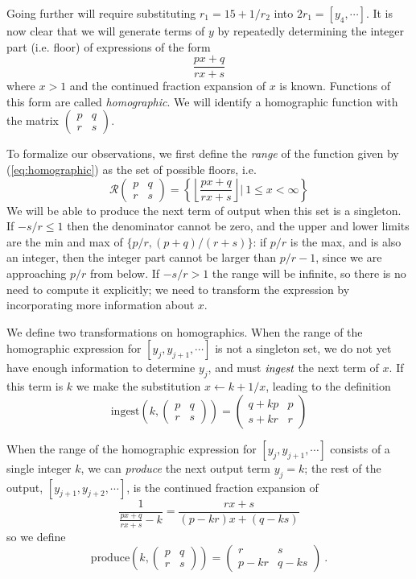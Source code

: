 \documentclass[11pt, oneside]{amsart}   	%
\newcommand{\pqrs}{\left(
\begin{smallmatrix} 
p & q\\ 
r & s 
\end{smallmatrix}
\right)}
\newcommand{\homographic}[4]{\begin{pmatrix} #1 & #2\\ #3 & #4 \end{pmatrix}}
\renewcommand{\:}{\negthickspace:\negthickspace}
\begin{document}
Going further will require substituting $r_1 = 15+1/r_2$ into $2r_1 = [y_4,\cdots]$.
It is now clear that we will generate terms of $y$ by repeatedly determining the integer part (i.e. floor) of expressions of the form
\begin{equation}\label{eq:homographic}
\frac{px+q}{rx+s}
\end{equation}
where $x>1$ and the continued fraction expansion of $x$ is known. Functions of this form are called \emph{homographic}.
We will identify a homographic function with the matrix
$\left(
\begin{smallmatrix} 
p & q\\ 
r & s 
\end{smallmatrix}
\right)$.

To formalize our observations, we first define the \emph{range} of the function given by (\ref{eq:homographic})
as the set of possible floors, i.e.
\[
\mathcal{R}\pqrs = \left\{ \left\lfloor \frac{px+q}{rx+s} \right\rfloor | \  1 \leq x < \infty \right\}
\]
We will be able to produce the next term of output when this set is a singleton. If $-s/r \leq 1$ then the denominator cannot be zero,
and the upper and lower limits are the min and max of $\{p/r, (p+q)/(r+s)\}$: if $p/r$ is the max, and is also an integer, then the
integer part cannot be larger than $p/r-1$, since we are approaching $p/r$ from below. If  $-s/r > 1$ the range will be infinite, so
there is no need to compute it explicitly; we need to transform the expression by incorporating more information about $x$.

We define two transformations on homographics. When the range of the homographic expression for $[y_j,y_{j+1},\cdots]$ is not a
singleton set, we do not yet have enough information to determine $y_j$, and must $\emph{ingest}$ the next term of $x$. If this term
is $k$ we make the substitution $x \leftarrow k + 1/x$, leading to the definition
\[
\mbox{ingest}(k,\pqrs) = \homographic{q+kp}{p}{s+kr}{r}%
\]

When the range of the homographic expression for $[y_j,y_{j+1},\cdots]$ consists of a single integer $k$, we can \emph{produce}
the next output term $y_j = k$; the rest of the output, $[y_{j+1},y_{j+2},\cdots]$, is the continued fraction expansion of
\[
\frac{1}{\frac{px+q}{rx+s}-k} = \frac{rx+s}{(p-kr)x + (q-ks)}
\] 
so we define 
\[
\mbox{produce}(k,\pqrs) = \homographic{r}{s}{p-kr}{q-ks}\ .
\]
\end{document}
